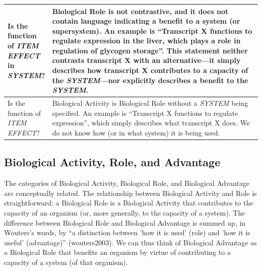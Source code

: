 \documentclass{article}
\begin{document}
\begin{landscape}
\begin{table}
\begin{tabular}{|p{0.17\linewidth}|p{0.97\linewidth}|}
    \hline
    Is the function of \emph{ITEM} \emph{EFFECT} in \emph{SYSTEM}? &  Biological Role is not contrastive, and it does not contain language indicating a benefit to a system (or supersystem). An example is ``Transcript X functions to regulate expression in the liver, which plays a role in regulation of glycogen storage''. This statement neither contrasts transcript X with an alternative---it simply describes how transcript X contributes to a capacity of the \emph{SYSTEM}---nor explicitly describes a benefit to the \emph{SYSTEM}.  \\
    \hline
    Is the function of \emph{ITEM} \emph{EFFECT}? &  Biological Activity is Biological Role without a \emph{SYSTEM} being specified. An example is ``Transcript X functions to regulate expression'', which simply describes what transcript X does. We do not know how (or in what system) it is being used. \\
    \hline
  \end{tabular}
  \label{tab:flowchart}
\end{table}
\end{landscape}

\subsection{Biological Activity, Role, and Advantage}
\label{sec:relat-betw-funct}

The categories of Biological Activity, Biological Role, and Biological Advantage are conceptually related.
The relationship between Biological Activity and Role is straightforward: a Biological Role is a Biological Activity that contributes to the capacity of an organism (or, more generally, to the capacity of a system). 
The difference between Biological Role and Biological Advantage is summed up, in Wouters's words, by ``a distinction between 'how it is used' (role) and 'how it is useful' (advantage)'' (wouters2003).
We can thus think of Biological Advantage as a Biological Role that benefits an organism by virtue of contributing to a capacity of a system (of that organism).
\end{document}
